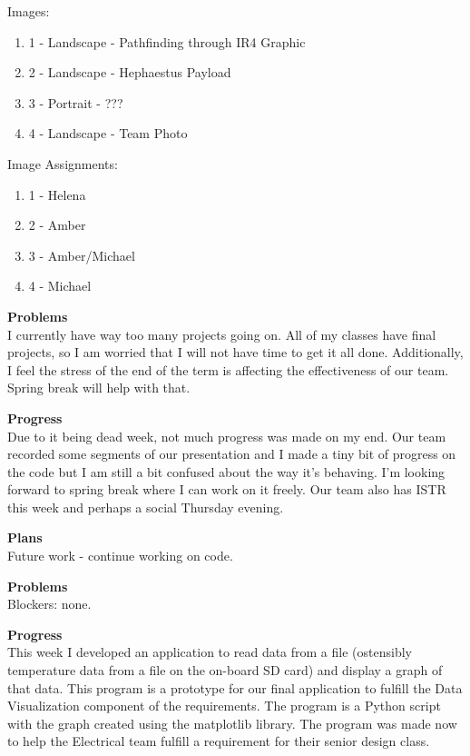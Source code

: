 Images: \\ 
\begin{enumerate}
\item{1 - Landscape - Pathfinding through IR4 Graphic}
\item{2 - Landscape - Hephaestus Payload}
\item{3 - Portrait - ???}
\item{4 - Landscape - Team Photo}
\end{enumerate}

Image Assignments: \\ 
\begin{enumerate}
\item{1 - Helena}
\item{2 - Amber}
\item{3 - Amber/Michael}
\item{4 - Michael}
\end{enumerate}

\textbf{Problems} \\ 
I currently have way too many projects going on. All of my classes have final projects, so I am worried that I will not have time to get it all done. Additionally, I feel the stress of the end of the term is affecting the effectiveness of our team. Spring break will help with that.

\textbf{Progress} \\
Due to it being dead week, not much progress was made on my end. Our team recorded some segments of our presentation and I made a tiny bit of progress on
the code but I am still a bit confused about the way it's behaving. I'm looking forward to spring break where I can work on it freely. Our team also has 
ISTR this week and perhaps a social Thursday evening.

\textbf{Plans} \\
Future work - continue working on code.

\textbf{Problems} \\ 
Blockers: none.

\textbf{Progress} \\
This week I developed an application to read data from a file (ostensibly 
temperature data from a file on the on-board SD card) and display a graph of 
that data. This program is a prototype for our final application to fulfill 
the Data Visualization component of the requirements. The program is a Python 
script with the graph created using the matplotlib library. The program was 
made now to help the Electrical team fulfill a requirement for their senior 
design class.

